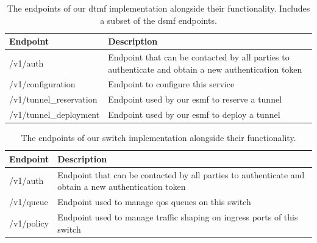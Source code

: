 \begin{table}[htp]
    \begin{tabularx}{\textwidth}{ |l|X| }
        \hline
        \textbf{Endpoint} & \textbf{Description} \\
        \hline
         /v1/auth & Endpoint that can be contacted by all parties to authenticate and obtain a new authentication token \\
         /v1/configuration & Endpoint to configure this service \\
        \hline
         /v1/tunnel\_reservation & Endpoint used by our \acrshort{esmf} to reserve a tunnel  \\
         /v1/tunnel\_deployment & Endpoint used by our \acrshort{esmf} to deploy a tunnel \\
        \hline
    \end{tabularx}
    \caption[\acrshort{dtmf} endpoints]{The endpoints of our \acrshort{dtmf} implementation alongside their functionality. Includes a subset of the \acrshort{dsmf} endpoints.}
    \label{table:dtmf}
\end{table}

\begin{table}[htp]
    \begin{tabularx}{\textwidth}{ |l|X| }
        \hline
        \textbf{Endpoint} & \textbf{Description} \\
        \hline
         /v1/auth & Endpoint that can be contacted by all parties to authenticate and obtain a new authentication token \\
        \hline
         /v1/queue & Endpoint used to manage \acrshort{qos} queues on this switch \\
         /v1/policy & Endpoint used to manage traffic shaping on ingress ports of this switch \\
        \hline
    \end{tabularx}
    \caption[Switch endpoints]{The endpoints of our switch implementation alongside their functionality.}
    \label{table:switch}
\end{table}

